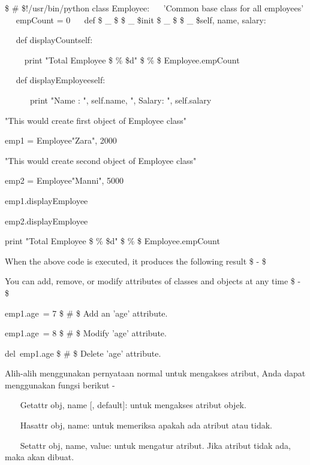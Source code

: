  \$  \#  \$!/usr/bin/python 
class Employee: 
~~ 'Common base class for all employees' 
~~ empCount = 0 
~~ def  \$  \_  \$ \$  \_  \$init \$  \_  \$ \$  \_  \${self, name, salary}: 
\item 
~~ def displayCount{self}: 
\item 
~~~~ print "Total Employee  \$  \%  \$d"  \$  \%  \$ Employee.empCount 
\begin{12pt}
\item 
~~ def displayEmployee{self}: 
\item 
~~~~~~print "Name : ", self.name,  ", Salary: ", self.salary 
\begin{12pt}
\item
"This would create first object of Employee class" 
\item 
emp1 = Employee{"Zara", 2000} 
\item 
"This would create second object of Employee class"
\item
emp2 = Employee{"Manni", 5000} 
\item
emp1.displayEmployee{} 
\item
emp2.displayEmployee{} 
\item
print "Total Employee  \$  \%  \$d"  \$  \%  \$ Employee.empCount \par
\item
When the above code is executed, it produces the following result  \$ - \$ \par
You can add, remove, or modify attributes of classes and objects at any time  \$ - \$ \par
\noindent 
emp1.age~= 7   \$  \#  \$ Add an 'age' attribute. \par
\noindent 
emp1.age~= 8   \$  \#  \$ Modify 'age' attribute. \par
\noindent 
del~emp1.age   \$  \#  \$ Delete 'age' attribute. \par
\vspace{12pt}
Alih-alih menggunakan pernyataan normal untuk mengakses atribut, Anda dapat menggunakan fungsi berikut - \par
\vspace{12pt}
\noindent 
~~~ Getattr {obj, name [, default]}: untuk mengakses atribut objek. \par
\vspace{12pt}
\noindent 
~~~ Hasattr {obj, name}: untuk memeriksa apakah ada atribut atau tidak. \par
\vspace{12pt}
\noindent 
~~~ Setattr {obj, name, value}: untuk mengatur atribut. Jika atribut tidak ada, maka akan dibuat. \par

\end{12pt}
\end{12pt}
